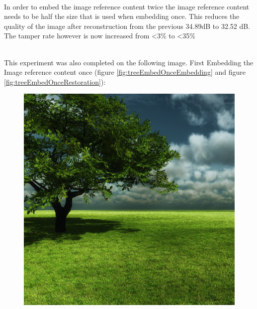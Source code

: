 \documentclass[12pt]{article}
\begin{document}
\hspace{0pt} \\
In order to embed the image reference content twice the image reference content needs to be half the size that is used when embedding once.
This reduces the quality of the image after reconstruction from the previous 34.89dB to 32.52 dB.
The tamper rate however is now increased from \textless 3\% to \textless 35\%

\hspace{0pt} \\
This experiment was also completed on the following image.
First Embedding the Image reference content once (figure \ref{fig:treeEmbedOnceEmbedding} and figure \ref{fig:treeEmbedOnceRestoration}):

\begin{figure}[h]
\centerline{%
\includegraphics[scale=0.3375]{"tree"}%
\hspace{0.1cm}
}
\end{figure}
\end{document}
